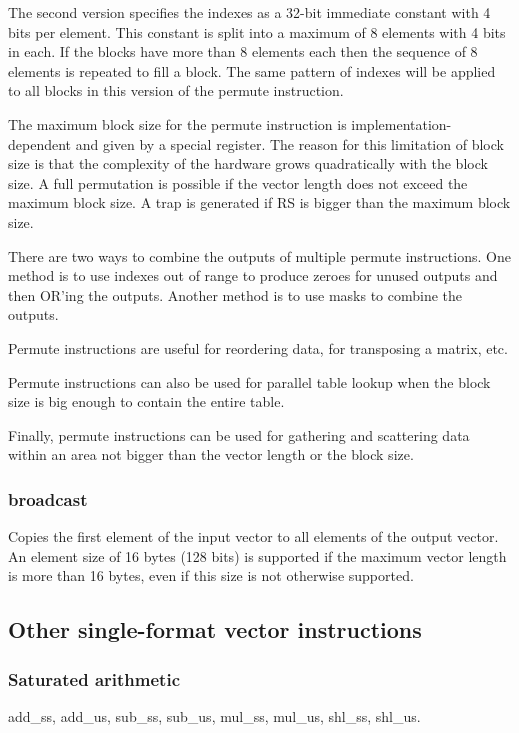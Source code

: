 \documentclass[forwardcom.tex]{subfiles}
\begin{document}
The second version specifies the indexes as a 32-bit immediate constant with 4 bits per element. This constant is split into a maximum of 8 elements with 4 bits in each. If the blocks have more than 8 elements each then the sequence of 8 elements is repeated to fill a block. The same pattern of indexes will be applied to all blocks in this version of the permute instruction.
\vspace{2mm}

The maximum block size for the permute instruction is implementation-dependent and given by a special register. The reason for this limitation of block size is that the complexity of the hardware grows quadratically with the block size. A full permutation is possible if the vector length does not exceed the maximum block size. A trap is generated if RS is bigger than the maximum block size.
\vspace{2mm}

There are two ways to combine the outputs of multiple permute instructions. One method is to use indexes out of range to produce zeroes for unused outputs and then OR'ing the outputs. Another method is to use masks to combine the outputs.
\vspace{2mm}

Permute instructions are useful for reordering data, for transposing a matrix, etc. 
\vspace{2mm}

Permute instructions can also be used for parallel table lookup when the block size is big enough to contain the entire table.
\vspace{2mm}

Finally, permute instructions can be used for gathering and scattering data within an area not bigger than the vector length or the block size.

\subsubsection{broadcast}
Copies the first element of the input vector to all elements of the output vector. An element size of 16 bytes (128 bits) is supported if the maximum vector length is more than 16 bytes, even if this size is not otherwise supported.


\subsection{Other single-format vector instructions}

\subsubsection{Saturated arithmetic} \label{saturatedArithmeticInstructions}
add\_ss, add\_us, sub\_ss, sub\_us, mul\_ss, mul\_us, shl\_ss, shl\_us.
\vspace{2mm}
\end{document}
